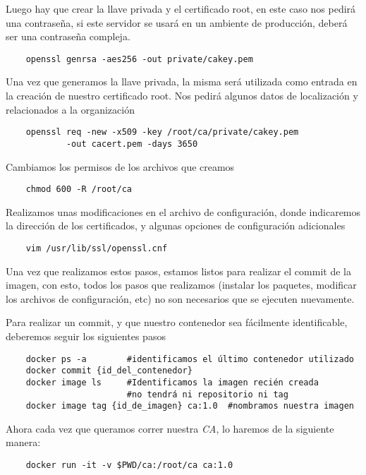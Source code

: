 \noindent Luego hay que crear la llave privada y el certificado root, en este caso nos pedirá una contraseña, si este servidor 
se usará en un ambiente de producción, deberá ser una contraseña compleja.

\begin{verbatim}
    openssl genrsa -aes256 -out private/cakey.pem

\end{verbatim}

\noindent Una vez que generamos la llave privada, la misma será utilizada como entrada en la creación de 
nuestro certificado root. Nos pedirá algunos datos de localización y relacionados a la 
organización

\begin{verbatim}
    openssl req -new -x509 -key /root/ca/private/cakey.pem 
            -out cacert.pem -days 3650
\end{verbatim}

\noindent Cambiamos los permisos de los archivos que creamos
\begin{verbatim}
    chmod 600 -R /root/ca
\end{verbatim}

\noindent Realizamos unas modificaciones en el archivo de configuración, donde indicaremos 
la dirección de los certificados, y algunas opciones de configuración adicionales
\begin{verbatim}
    vim /usr/lib/ssl/openssl.cnf
\end{verbatim}

Una vez que realizamos estos pasos, estamos listos para realizar el commit de la imagen, con esto,
todos los pasos que realizamos (instalar los paquetes, modificar los archivos de configuración, etc)
no son necesarios que se ejecuten nuevamente.

Para realizar un commit, y que nuestro contenedor sea fácilmente identificable, deberemos seguir 
los siguientes pasos

\begin{verbatim}
    docker ps -a        #identificamos el último contenedor utilizado
    docker commit {id_del_contenedor} 
    docker image ls     #Identificamos la imagen recién creada
                        #no tendrá ni repositorio ni tag
    docker image tag {id_de_imagen} ca:1.0  #nombramos nuestra imagen
\end{verbatim}




Ahora cada vez que queramos correr nuestra \emph{CA}, lo haremos de la siguiente manera:
\begin{verbatim}
    docker run -it -v $PWD/ca:/root/ca ca:1.0
\end{verbatim}

